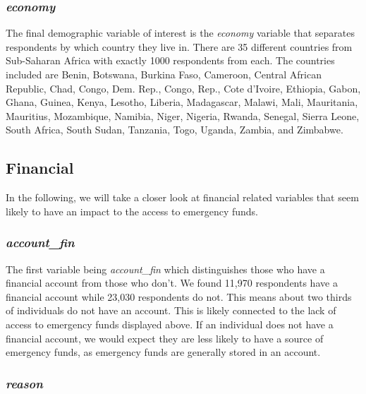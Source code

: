 \documentclass[water,article,submit,moreauthors,pdftex]{mdpi}
\begin{document}
\hypertarget{economy}{%
\subsubsection{\texorpdfstring{\emph{economy}}{economy}}\label{economy}}

The final demographic variable of interest is the \emph{economy}
variable that separates respondents by which country they live in. There
are 35 different countries from Sub-Saharan Africa with exactly 1000
respondents from each. The countries included are Benin, Botswana,
Burkina Faso, Cameroon, Central African Republic, Chad, Congo, Dem.
Rep., Congo, Rep., Cote d'Ivoire, Ethiopia, Gabon, Ghana, Guinea, Kenya,
Lesotho, Liberia, Madagascar, Malawi, Mali, Mauritania, Mauritius,
Mozambique, Namibia, Niger, Nigeria, Rwanda, Senegal, Sierra Leone,
South Africa, South Sudan, Tanzania, Togo, Uganda, Zambia, and Zimbabwe.

\hypertarget{financial}{%
\subsection{Financial}\label{financial}}

In the following, we will take a closer look at financial related
variables that seem likely to have an impact to the access to emergency
funds.

\hypertarget{account_fin}{%
\subsubsection{\texorpdfstring{\emph{account\_fin}}{account\_fin}}\label{account_fin}}

The first variable being \emph{account\_fin} which distinguishes those
who have a financial account from those who don't. We found 11,970
respondents have a financial account while 23,030 respondents do not.
This means about two thirds of individuals do not have an account. This
is likely connected to the lack of access to emergency funds displayed
above. If an individual does not have a financial account, we would
expect they are less likely to have a source of emergency funds, as
emergency funds are generally stored in an account.

\hypertarget{reason}{%
\subsubsection{\texorpdfstring{\emph{reason}}{reason}}\label{reason}}
\end{document}
